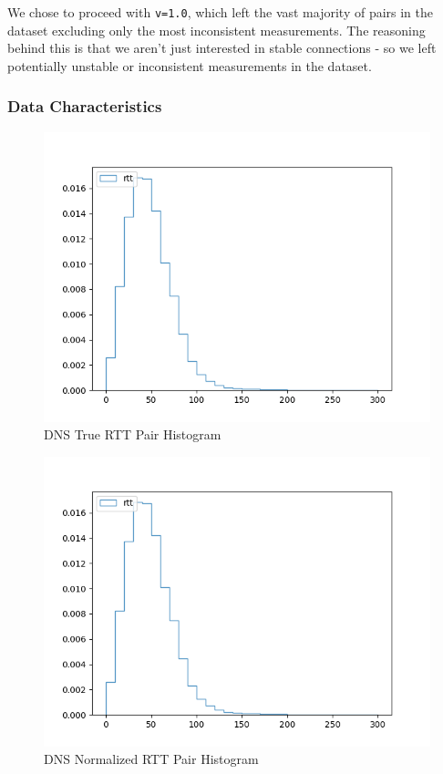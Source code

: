 We chose to proceed with \texttt{v=1.0}, which left the vast majority of pairs in the dataset excluding only the most inconsistent measurements. The reasoning behind this is that we aren't just interested in stable connections - so we left potentially unstable or inconsistent measurements in the dataset.

\subsubsection{Data Characteristics}

\begin{figure}[H]
    \centering
    \includegraphics{images/dns/analysis_no_auth_agg/rtt/all_pairs_histogram.png}
    \caption{DNS True RTT Pair Histogram}
    \label{fig:dns_true_rtt_pair_histogram}
\end{figure}

\begin{figure}[H]
    \centering
    \includegraphics{images/dns/analysis_no_auth_agg/rtt/all_pairs_histogram.png}
    \caption{DNS Normalized RTT Pair Histogram}
    \label{fig:dns_norm_rtt_pair_histogram}
\end{figure}

